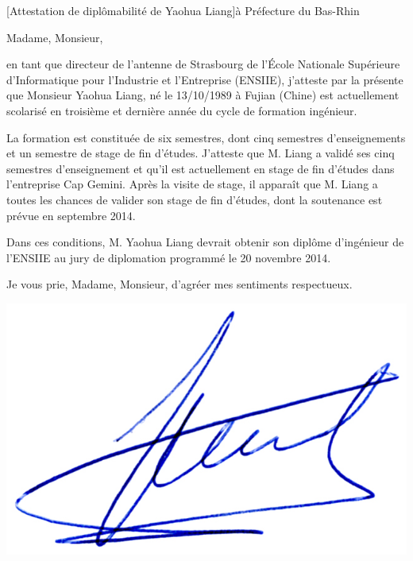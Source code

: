 \documentclass[a4paper,10pt]{article}
\begin{document}

\begin{letter}[Attestation de diplômabilité de Yaohua Liang]{à}%
{Préfecture du Bas-Rhin}


Madame, Monsieur,


\vspace{1cm} en  tant que  directeur de l'antenne  de Strasbourg  de l'\'{E}cole
Nationale Supérieure  d'Informatique pour l'Industrie et  l'Entreprise (ENSIIE),
j'atteste par la  présente que Monsieur Yaohua Liang, né  le 13/10/1989 à Fujian
(Chine) est  actuellement scolarisé en troisième  et dernière année du  cycle de
formation ingénieur.

La   formation  est   constituée   de  six   semestres,   dont  cinq   semestres
d'enseignements et un semestre de stage  de fin d'études. J'atteste que M. Liang
a validé ses cinq semestres d'enseignement et qu'il est actuellement en stage de
fin d'études dans l'entreprise Cap Gemini. Après la visite de stage, il apparaît
que M. Liang a toutes les chances de  valider son stage de fin d'études, dont la
soutenance est prévue en septembre 2014.

Dans ces conditions, M. Yaohua Liang devrait obtenir son diplôme d'ingénieur de
l'ENSIIE au jury de diplomation programmé le 20 novembre 2014. 

\vspace{1cm}

Je vous prie, Madame, Monsieur, d'agréer mes sentiments respectueux.  
\hfill


\end{letter}
\begin{flushright}
\includegraphics[width=.2\textwidth]{signgenaud.jpg}
\end{flushright}
\end{document}
